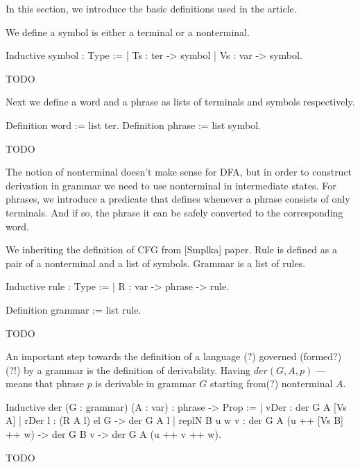 In this section, we introduce the basic definitions used in the article.

We define a symbol is either a terminal or a nonterminal.

\begin{listing}[h]
    \begin{pyglist}[language=coq, numbers=none, numbersep=5pt]
  Inductive symbol : Type :=
    | Ts : ter -> symbol
    | Vs : var -> symbol.
    \end{pyglist}
    \caption{TODO}
    \label{lst:verbments1}
\end{listing}

Next we define a word and a phrase as lists of terminals and symbols respectively. 

\begin{listing}[h]
    \begin{pyglist}[language=coq, numbers=none, numbersep=5pt]
  Definition word := list ter.
  Definition phrase := list symbol.
    \end{pyglist}
    \caption{TODO}
    \label{lst:verbments1}
\end{listing}

The notion of nonterminal doesn't make sense for DFA, but in order to construct derivation in grammar we need to use nonterminal in intermediate states. For phrases, we introduce a predicate that defines whenever a phrase consists of only terminals. And if so, the phrase it can be safely converted to the corresponding word.

We inheriting the definition of CFG from [Smplka] paper. Rule is defined as a pair of a nonterminal and a list of symbols. Grammar is a list of rules. 

\begin{listing}[h]
    \begin{pyglist}[language=coq, numbers=none, numbersep=5pt]
  Inductive rule : Type :=
  | R : var -> phrase -> rule.
        
  Definition grammar := list rule.
    \end{pyglist}
    \caption{TODO}
    \label{lst:verbments1}
\end{listing}

An important step towards the definition of a language (?) governed (formed?)(?!) by a grammar is the definition of derivability. Having $der(G, A, p)$ --- means that phrase $p$ is derivable in grammar $G$ starting from(?) nonterminal $A$.

\begin{listing}[h]
    \begin{pyglist}[language=coq, numbers=none, numbersep=5pt]
  Inductive der (G : grammar) 
        (A : var) : phrase -> Prop :=
  | vDer : der G A [Vs A]
  | rDer l : (R A l) el G -> der G A l
  | replN B u w v : 
      der G A (u ++ [Vs B] ++ w) -> 
      der G B v -> der G A (u ++ v ++ w).
    \end{pyglist}
    \caption{TODO}
    \label{lst:verbments1}
\end{listing}

